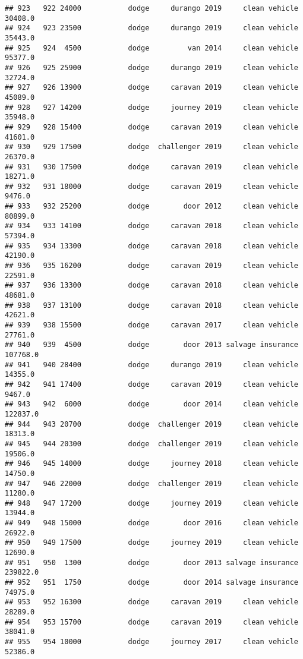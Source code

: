 \documentclass[
]{article}
\begin{document}
\begin{verbatim}
## 923   922 24000           dodge     durango 2019     clean vehicle   30408.0
## 924   923 23500           dodge     durango 2019     clean vehicle   35443.0
## 925   924  4500           dodge         van 2014     clean vehicle   95377.0
## 926   925 25900           dodge     durango 2019     clean vehicle   32724.0
## 927   926 13900           dodge     caravan 2019     clean vehicle   45089.0
## 928   927 14200           dodge     journey 2019     clean vehicle   35948.0
## 929   928 15400           dodge     caravan 2019     clean vehicle   41601.0
## 930   929 17500           dodge  challenger 2019     clean vehicle   26370.0
## 931   930 17500           dodge     caravan 2019     clean vehicle   18271.0
## 932   931 18000           dodge     caravan 2019     clean vehicle    9476.0
## 933   932 25200           dodge        door 2012     clean vehicle   80899.0
## 934   933 14100           dodge     caravan 2018     clean vehicle   57394.0
## 935   934 13300           dodge     caravan 2018     clean vehicle   42190.0
## 936   935 16200           dodge     caravan 2019     clean vehicle   22591.0
## 937   936 13300           dodge     caravan 2018     clean vehicle   48681.0
## 938   937 13100           dodge     caravan 2018     clean vehicle   42621.0
## 939   938 15500           dodge     caravan 2017     clean vehicle   27761.0
## 940   939  4500           dodge        door 2013 salvage insurance  107768.0
## 941   940 28400           dodge     durango 2019     clean vehicle   14355.0
## 942   941 17400           dodge     caravan 2019     clean vehicle    9467.0
## 943   942  6000           dodge        door 2014     clean vehicle  122837.0
## 944   943 20700           dodge  challenger 2019     clean vehicle   18313.0
## 945   944 20300           dodge  challenger 2019     clean vehicle   19506.0
## 946   945 14000           dodge     journey 2018     clean vehicle   14750.0
## 947   946 22000           dodge  challenger 2019     clean vehicle   11280.0
## 948   947 17200           dodge     journey 2019     clean vehicle   13944.0
## 949   948 15000           dodge        door 2016     clean vehicle   26922.0
## 950   949 17500           dodge     journey 2019     clean vehicle   12690.0
## 951   950  1300           dodge        door 2013 salvage insurance  239822.0
## 952   951  1750           dodge        door 2014 salvage insurance   74975.0
## 953   952 16300           dodge     caravan 2019     clean vehicle   28289.0
## 954   953 15700           dodge     caravan 2019     clean vehicle   38041.0
## 955   954 10000           dodge     journey 2017     clean vehicle   52386.0

\end{verbatim}
\end{document}
